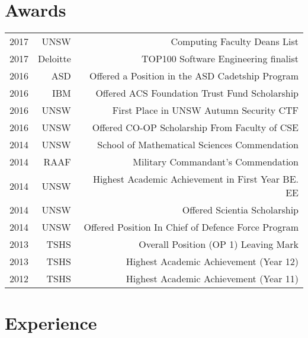 \documentclass[letterpaper]{twentysecondcv} %
\begin{document}
\section{Awards}
\begin{tabular}{l@{\hskip 0.6in}r@{\hskip 0.7in}r}
2017 & UNSW & Computing Faculty Deans List \\
2017 & Deloitte & TOP100 Software Engineering finalist \\
2016 & ASD & Offered a Position in the ASD Cadetship Program \\
2016 & IBM &  Offered ACS Foundation Trust Fund Scholarship \\
2016 & UNSW & First Place in UNSW Autumn Security CTF \\
2016 & UNSW & Offered CO-OP Scholarship From Faculty of CSE\\
2014 & UNSW & School of Mathematical Sciences Commendation\\
2014 & RAAF & Military Commandant's Commendation\\
2014 & UNSW & Highest Academic Achievement in First Year BE. EE\\
2014 & UNSW & Offered Scientia Scholarship\\
2014 & UNSW & Offered Position In Chief of Defence Force Program\\
2013	& TSHS & Overall Position (OP 1) Leaving Mark\\
2013 & TSHS & Highest Academic Achievement (Year 12)\\
2012 & TSHS & Highest Academic Achievement (Year 11)\\
\end{tabular} \vspace{5mm}


\section{Experience}
\end{document}
